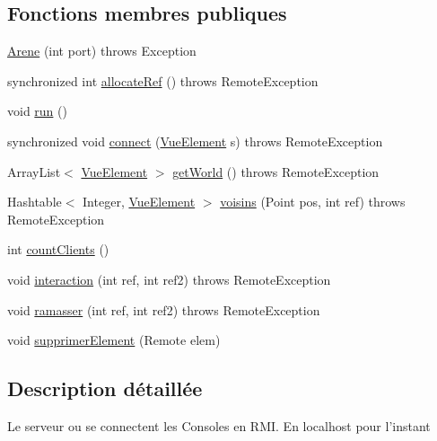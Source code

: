 \subsection*{Fonctions membres publiques}
\begin{DoxyCompactItemize}
\item 
\hyperlink{classserveur_1_1_arene_a5431d21bfdc858dbe31c6ec6b046aaca}{Arene} (int port)  throws Exception 
\item 
synchronized int \hyperlink{classserveur_1_1_arene_a88151079f2665d1973168e0cb266e3c7}{allocate\-Ref} ()  throws Remote\-Exception 
\item 
void \hyperlink{classserveur_1_1_arene_af37bb33255b051fa9236a62507eaf0ab}{run} ()
\item 
synchronized void \hyperlink{classserveur_1_1_arene_aa0f409b1844a97c1c413f04116cf863e}{connect} (\hyperlink{classinterface_graphique_1_1_vue_element}{Vue\-Element} s)  throws Remote\-Exception 
\item 
Array\-List$<$ \hyperlink{classinterface_graphique_1_1_vue_element}{Vue\-Element} $>$ \hyperlink{classserveur_1_1_arene_a83fb30e5a71d573d180997e60ab41304}{get\-World} ()  throws Remote\-Exception 
\item 
Hashtable$<$ Integer, \hyperlink{classinterface_graphique_1_1_vue_element}{Vue\-Element} $>$ \hyperlink{classserveur_1_1_arene_a1b8ef284b2fae162ba68884bfbe0160a}{voisins} (Point pos, int ref)  throws Remote\-Exception 
\item 
int \hyperlink{classserveur_1_1_arene_ad1bdc1a3aa97354caf2cb8c7d3f1a19b}{count\-Clients} ()
\item 
void \hyperlink{classserveur_1_1_arene_ae8331f4b3d827f4c93d4b1c08a0d9399}{interaction} (int ref, int ref2)  throws Remote\-Exception 
\item 
void \hyperlink{classserveur_1_1_arene_a930bd7387f12b44bcbfdc117fbd13672}{ramasser} (int ref, int ref2)  throws Remote\-Exception 
\item 
void \hyperlink{classserveur_1_1_arene_abbe9b4c0d7f5dcd711c702dc43c542f3}{supprimer\-Element} (Remote elem)
\end{DoxyCompactItemize}


\subsection{Description détaillée}
Le serveur ou se connectent les Consoles en R\-M\-I. En localhost pour l'instant 


